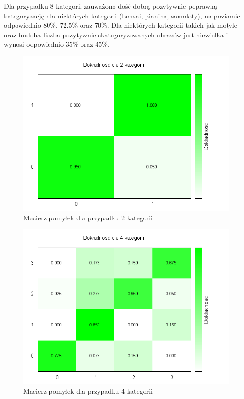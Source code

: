 Dla przypadku 8 kategorii zauważono dość dobrą pozytywnie poprawną kategoryzację dla niektórych kategorii (bonsai, pianina, samoloty), na poziomie odpowiednio 80\%, 72.5\% oraz 70\%. Dla niektórych kategorii takich jak motyle oraz buddha liczba pozytywnie skategoryzowanych obrazów jest niewielka i wynosi odpowiednio 35\% oraz 45\%.

\begin{figure}[h]
	\centering
	\includegraphics[scale=0.8]{graphics/04_interpretacja_wynikow/confusion-matrix-2.png}
	\caption{ Macierz pomyłek dla przypadku 2 kategorii }
	\label{fig:confusion-matrix-2}
\end{figure}

\begin{figure}[h]
	\centering
	\includegraphics[scale=0.8]{graphics/04_interpretacja_wynikow/confusion-matrix-4.png}
	\caption{ Macierz pomyłek dla przypadku 4 kategorii }
	\label{fig:confusion-matrix-4}
\end{figure}

